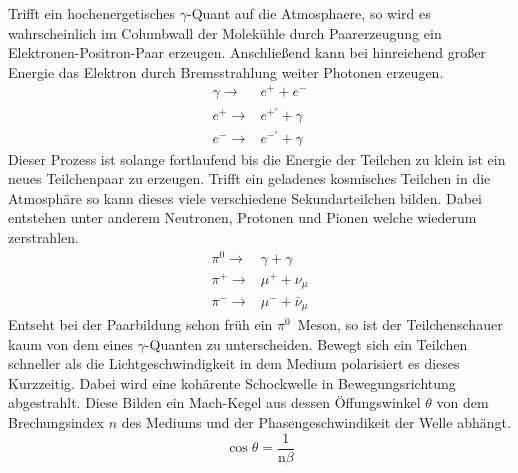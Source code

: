 Trifft ein hochenergetisches $\gamma$-Quant auf die Atmosphaere, so wird es wahrscheinlich im Columbwall der Molekühle durch Paarerzeugung ein Elektronen-Positron-Paar erzeugen. 
Anschließend kann bei hinreichend großer Energie das Elektron durch Bremsstrahlung weiter Photonen erzeugen. 
\begin{eqnarray}
  \gamma \rightarrow& e^{+} + e^{-} \\
  e^{+} \rightarrow& e^{+'} + \gamma \\
  e^{-} \rightarrow& e^{-'} + \gamma 
\end{eqnarray}
Dieser Prozess ist solange fortlaufend bis die Energie der Teilchen zu klein ist ein neues Teilchenpaar zu erzeugen. 
Trifft ein geladenes kosmisches Teilchen in die Atmosphäre so kann dieses viele verschiedene Sekundarteilchen bilden. 
Dabei entstehen unter anderem Neutronen, Protonen und Pionen welche wiederum zerstrahlen. 
\begin{eqnarray}
  \pi^{0} \rightarrow& \gamma + \gamma \\
  \pi^{+} \rightarrow& \mu^{+} + \nu_{\mu} \\
  \pi^{-} \rightarrow& \mu^{-} + \bar{\nu}_{\mu}
\end{eqnarray}
Entseht bei der Paarbildung schon früh ein $\pi^{0}$~Meson, so ist der Teilchenschauer kaum von dem eines $\gamma$-Quanten zu unterscheiden. 
 Bewegt sich ein Teilchen schneller als die Lichtgeschwindigkeit in dem Medium polarisiert es dieses Kurzzeitig. 
Dabei wird eine kohärente Schockwelle in Bewegungsrichtung abgestrahlt. Diese Bilden ein Mach-Kegel aus dessen Öffungswinkel $\theta$ von dem Brechungsindex $n$ des Mediums und der Phasengeschwindikeit der Welle abhängt.
\begin{equation}
  \cos  \theta = \frac{1}{\text{n} \beta}
\end{equation}

